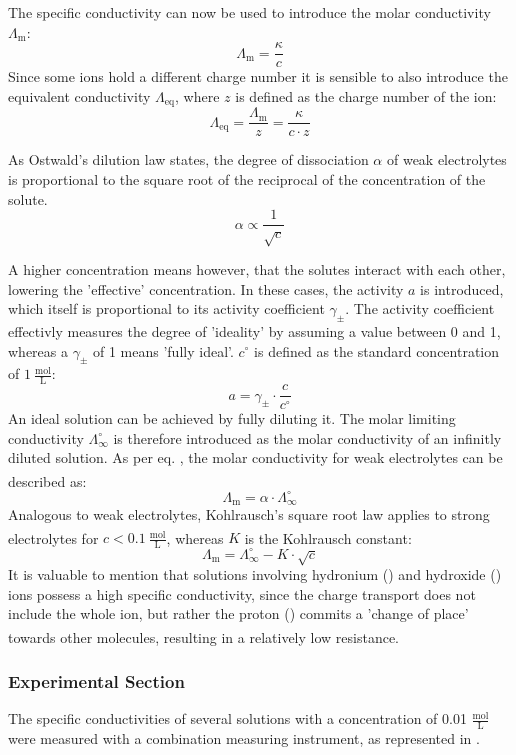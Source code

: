 \documentclass[
	a4paper,										%
	12pt,											%
	twoside,										%
	headsepline,								%
	footsepline,									%
	captions=tableheading,					%
]{scrartcl}
\newcommand{\zitat}[1]{\textsuperscript{\cite{#1}}}
\newcommand{\formel}[2]{				%
	\begin{equation}
		\label{eq: #1}							%
		#2											%
	\end{equation}}
\begin{document}
The specific conductivity can now be used to introduce the molar conductivity $\Lambda_{\mathrm{m}}$:
\formel{streber6}{\Lambda_{\mathrm{m}} = \frac{\kappa}{c}}
Since some ions hold a different charge number it is sensible to also introduce the equivalent conductivity $\Lambda_{\mathrm{eq}}$,
where $z$ is defined as the charge number of the ion:
\formel{streber7}{\Lambda_{\mathrm{eq}} = \frac{\Lambda_{\mathrm{m}}}{z} = \frac{\kappa}{c \cdot z}}

As Ostwald's dilution law states, the degree of dissociation $\alpha$ of weak electrolytes is proportional to the square root of the reciprocal of the concentration of the solute.
\formel{streber8}{\alpha \propto \frac{1}{\sqrt{c}}}

A higher concentration means however, that the solutes interact with each other, lowering the 'effective' concentration.
In these cases, the activity $a$ is introduced, which itself is proportional to its activity coefficient $\gamma_{\pm}$.
The activity coefficient effectivly measures the degree of 'ideality' by assuming a value between 0 and 1, whereas a $\gamma_{\pm}$ of 1 means 'fully ideal'.
$c^{\circ}$ is defined as the standard concentration of $1\ \mathrm{\frac{mol}{L}}$:
\formel{a1}{a = \gamma_{\pm} \cdot \frac{c}{c^{\circ}}}
An ideal solution can be achieved by fully diluting it.
The molar limiting conductivity $\Lambda^{\circ}_{\infty}$ is therefore introduced as the molar conductivity of an infinitly diluted solution.
As per eq. , the molar conductivity for weak electrolytes can be described as\zitat{kopie4}:
\formel{a2}{\Lambda_{\mathrm{m}} = \alpha \cdot \Lambda^{\circ}_{\infty}}
Analogous to weak electrolytes, Kohlrausch's square root law applies to strong electrolytes for $c < 0.1 \ \mathrm{\frac{mol}{L}}$, whereas $K$ is the Kohlrausch constant\zitat{kopie5}:
\formel{a3}{\Lambda_{\mathrm{m}} =\Lambda^{\circ}_{\infty} - K \cdot \sqrt{c}}
It is valuable to mention that solutions involving hydronium () and hydroxide () ions possess a high specific conductivity,
since the charge transport does not include the whole ion, but rather the proton () commits a 'change of place' towards other molecules,
resulting in a relatively low resistance.\zitat{kopie4}

\subsubsection{Experimental Section}

The specific conductivities of several solutions with a concentration of 0.01 $\mathrm{\frac{mol}{L}}$ were measured with a combination measuring instrument,
as represented in .
\end{document}
